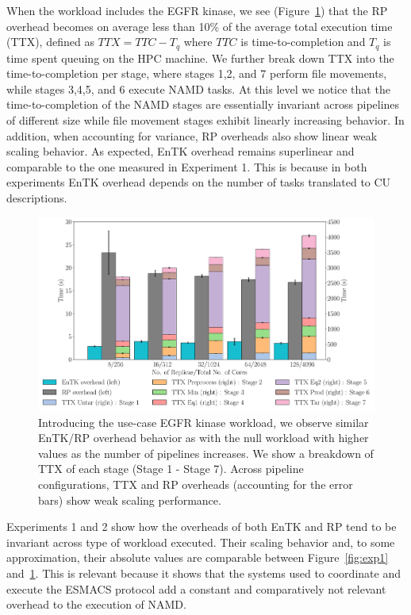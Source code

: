 \documentclass[conference]{IEEEtran}
\begin{document}
When the workload includes the EGFR kinase, we see (Figure~\ref{fig:exp2}) that the
RP overhead becomes on average less than 10\% of the average total execution
time (TTX), defined as \(TTX = TTC - T_q\) where \(TTC\) is
time-to-completion and \(T_q\) is time spent queuing on the HPC machine. We further break down TTX into the time-to-completion per stage, where stages 1,2, and 7 perform file movements, while stages 3,4,5, and 6 execute NAMD tasks. At this level we notice that the time-to-completion of the NAMD stages are essentially invariant across pipelines of different size while file movement stages exhibit linearly increasing behavior. In addition, when accounting for variance, RP overheads also show linear weak scaling behavior. 
%
%
%
As expected, EnTK overhead remains superlinear and
comparable to the one measured in Experiment 1. This is because in both
experiments EnTK overhead depends on the number of tasks translated to CU
descriptions.

\begin{figure}
  \centering
  \includegraphics[width=\columnwidth]{esmacs_32.pdf}
  \caption{Introducing the use-case EGFR kinase workload, we observe
  similar EnTK/RP overhead behavior as with the null workload with higher
  values as the number of pipelines increases. We show a breakdown of TTX of 
  each stage (Stage 1 - Stage 7). Across pipeline configurations, TTX and RP overheads 
  (accounting for the error bars) show
  weak scaling performance.}\label{fig:exp2}
\end{figure}

Experiments 1 and 2 show how the overheads of both EnTK and RP tend to be
invariant across type of workload executed. Their scaling behavior and, to
some approximation, their absolute values are comparable between
Figure~\ref{fig:exp1} and~\ref{fig:exp2}. This is relevant because it shows
that the systems used to coordinate and execute the ESMACS protocol add a
constant and comparatively not relevant overhead to the execution of NAMD\@.
 
\end{document}

